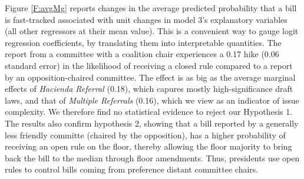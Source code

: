 \documentclass[letter,12pt]{article}
\begin{document}


Figure \ref{F:avgMg} reports changes in the average predicted probability that a bill is fast-tracked associated with unit changes in model 3's explanatory variables (all other regressors at their mean value). This is a convenient way to gauge logit regression coefficients, by translating them into interpretable quantities. The report from a committee with a coalition chair experiences a 0.17 hike (0.06 standard error) in the likelihood of receiving a closed rule compared to a report by an opposition-chaired committee. The effect is as big as the average marginal effects of \emph{Hacienda Referral} (0.18), which capures mostly high-significance draft laws, and that of \emph{Multiple Referrals} (0.16), which we view as an indicator of issue complexity. We therefore find no statistical evidence to reject our Hypothesis 1. The results also confirm hypothesis 2, showing that a bill reported by a generally less friendly committe (chaired by the opposition), has a higher probability of receiving an open rule on the floor, thereby allowing the floor majority to bring back the bill to the median through floor amendments. Thus, presidents use open rules to control bills coming from preference distant committee chairs.
\end{document}
